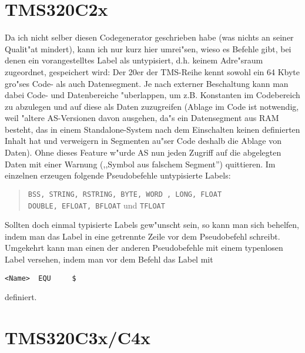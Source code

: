\documentclass[12pt,a4paper,twoside]{report}
\begin{document}

\section{TMS320C2x}

Da ich nicht selber diesen Codegenerator geschrieben habe (was nichts an
seiner Qualit"at mindert), kann ich nur kurz hier umrei"sen, wieso es
Befehle gibt, bei denen ein vorangestelltes Label als untypisiert, d.h.
keinem Adre"sraum zugeordnet, gespeichert wird:  Der 20er der TMS-Reihe
kennt sowohl ein 64 Kbyte gro"ses Code- als auch Datensegment.  Je nach
externer Beschaltung kann man dabei Code- und Datenbereiche "uberlappen,
um z.B. Konstanten im Codebereich zu abzulegen und auf diese als Daten
zuzugreifen (Ablage im Code ist notwendig, weil "altere AS-Versionen davon
ausgehen, da"s ein Datensegment aus RAM besteht, das in einem
Standalone-System nach dem Einschalten keinen definierten Inhalt hat und
verweigern in Segmenten au"ser Code deshalb die Ablage von Daten).  Ohne
dieses Feature w"urde AS nun jeden Zugriff auf die abgelegten Daten mit
einer Warnung (,,Symbol aus falschem Segment'') quittieren.  Im einzelnen
erzeugen folgende Pseudobefehle untypisierte Labels:
\begin{quote}
  {\tt BSS, STRING, RSTRING, BYTE, WORD , LONG, FLOAT \\
  DOUBLE, EFLOAT, BFLOAT} und {\tt TFLOAT}
\end{quote}
Sollten doch einmal typisierte Labels gew"unscht sein, so kann man sich
behelfen, indem man das Label in eine getrennte Zeile vor dem Pseudobefehl
schreibt.  Umgekehrt kann man einen der anderen Pseudobefehle mit einem
typenlosen Label versehen, indem man vor dem Befehl das Label mit
\begin{verbatim}
<Name>  EQU     $
\end{verbatim}
definiert.


\section{TMS320C3x/C4x}
\end{document}

